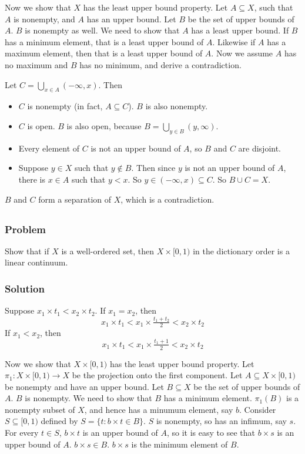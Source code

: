 Now we show that $X$ has the least upper bound property. Let $A \subseteq X$, such that $A$ is nonempty, and $A$ has an upper bound. Let $B$ be the set of upper bounds of $A$. $B$ is nonempty as well. We need to show that $A$ has a least upper bound. If $B$ has a minimum element, that is a least upper bound of $A$. Likewise if $A$ has a maximum element, then that is a least upper bound of $A$. Now we assume $A$ has no maximum and $B$ has no minimum, and derive a contradiction.

Let $C = \bigcup_{x \in A} (-\infty, x)$. Then 
\begin{itemize}
\item $C$ is nonempty (in fact, $A \subseteq C$). $B$ is also nonempty.
\item $C$ is open. $B$ is also open, because $B = \bigcup_{y \in B} (y, \infty)$.
\item Every element of $C$ is not an upper bound of $A$, so $B$ and $C$ are disjoint.
\item Suppose $y \in X$ such that $y \notin B$. Then since $y$ is not an upper bound of $A$, there is $x \in A$ such that $y < x$. So $y \in (-\infty, x) \subseteq C$. So $B \cup C = X$.
\end{itemize}
$B$ and $C$ form a separation of $X$, which is a contradiction.


\setcounter{subsection}{5} %
\subsection{}

\subsubsection{Problem}
Show that if $X$ is a well-ordered set, then $X \times [0,1)$ in the dictionary order is a linear continuum.

\subsubsection{Solution}
Suppose $x_1 \times t_1 < x_2 \times t_2$. If $x_1 = x_2$, then
\[x_1 \times t_1 <x_1 \times \tfrac{t_1+t_2}{2} <x_2 \times t_2\]
If $x_1 < x_2$, then
\[x_1 \times t_1 <x_1 \times \tfrac{t_1+1}{2} <x_2 \times t_2\]

Now we show that $X \times [0,1)$ has the least upper bound property. Let $\pi_1 : X \times [0,1) \to X$ be the projection onto the first component. Let $A \subseteq X \times [0,1)$ be nonempty and have an upper bound. Let $B \subseteq X$ be the set of upper bounds of $A$. $B$ is nonempty. We need to show that $B$ has a minimum element. $\pi_1(B)$ is a nonempty subset of $X$, and hence has a minumum element, say $b$. Consider $S \subseteq [0,1)$ defined by $S = \{t : b \times t \in B\}$. $S$ is nonempty, so has an infimum, say $s$. For every $t \in S$, $b \times t$ is an upper bound of $A$, so it is easy to see that $b \times s$ is an upper bound of $A$. $b \times s \in B$. $b \times s$ is the minimum element of $B$.
